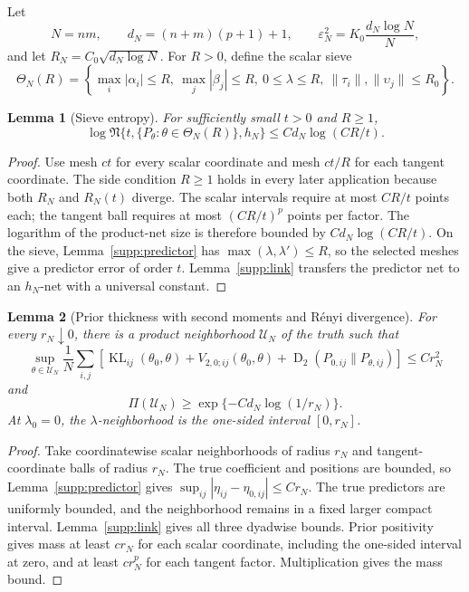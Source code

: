 \documentclass[
  12pt]{article}
\newtheorem{lemma}{Lemma}[section]
\theoremstyle{definition}
\theoremstyle{plain}
\newcommand{\KL}{\operatorname{KL}}
\newcommand{\Renyi}{\operatorname{D}_{2}}
\newcommand{\eps}{\varepsilon}
\newcommand{\cover}{\mathfrak N}
\begin{document}
Let
\[
N=nm,
\qquad
d_N=(n+m)(p+1)+1,
\qquad
\eps_N^2=K_0\frac{d_N\log N}{N},
\]
and let $R_N=C_0\sqrt{d_N\log N}$. For $R>0$, define the scalar sieve
\[
\Theta_N(R)=\left\{\max_i|\alpha_i|\le R,\ \max_j|\beta_j|\le R,\ 0\le\lambda\le R,\ \|\tau_i\|,\|\upsilon_j\|\le R_0\right\}.
\]

\begin{lemma}[Sieve entropy]
	\label{supp:entropy}
	For sufficiently small $t>0$ and $R\ge1$,
	\[
	\log\cover\{t,\{P_\theta:\theta\in\Theta_N(R)\},h_N\}
	\le C d_N\log(CR/t).
	\]
\end{lemma}

\begin{proof}
	Use mesh $ct$ for every scalar coordinate and mesh $ct/R$ for each tangent coordinate. The side condition $R\ge1$ holds in every later application because both $R_N$ and $R_N(t)$ diverge. The scalar intervals require at most $CR/t$ points each; the tangent ball requires at most $(CR/t)^p$ points per factor. The logarithm of the product-net size is therefore bounded by $Cd_N\log(CR/t)$. On the sieve, Lemma~\ref{supp:predictor} has $\max(\lambda,\lambda')\le R$, so the selected meshes give a predictor error of order $t$. Lemma~\ref{supp:link} transfers the predictor net to an $h_N$-net with a universal constant.
\end{proof}

\begin{lemma}[Prior thickness with second moments and R\'enyi divergence]
	\label{supp:prior}
	For every $r_N\downarrow0$, there is a product neighborhood $\mathcal U_N$ of the truth such that
	\[
	\sup_{\theta\in\mathcal U_N}
	\frac1N\sum_{i,j}
	\left[
	\KL_{ij}(\theta_0,\theta)+V_{2,0;ij}(\theta_0,\theta)
	+\Renyi(P_{0,ij}\|P_{\theta,ij})
	\right]
	\le Cr_N^2
	\]
	and
	\[
	\Pi(\mathcal U_N)\ge\exp\{-Cd_N\log(1/r_N)\}.
	\]
	At $\lambda_0=0$, the $\lambda$-neighborhood is the one-sided interval $[0,r_N]$.
\end{lemma}

\begin{proof}
	Take coordinatewise scalar neighborhoods of radius $r_N$ and tangent-coordinate balls of radius $r_N$. The true coefficient and positions are bounded, so Lemma~\ref{supp:predictor} gives $\sup_{ij}|\eta_{ij}-\eta_{0,ij}|\le Cr_N$. The true predictors are uniformly bounded, and the neighborhood remains in a fixed larger compact interval. Lemma~\ref{supp:link} gives all three dyadwise bounds. Prior positivity gives mass at least $cr_N$ for each scalar coordinate, including the one-sided interval at zero, and at least $cr_N^p$ for each tangent factor. Multiplication gives the mass bound.
\end{proof}
\end{document}
